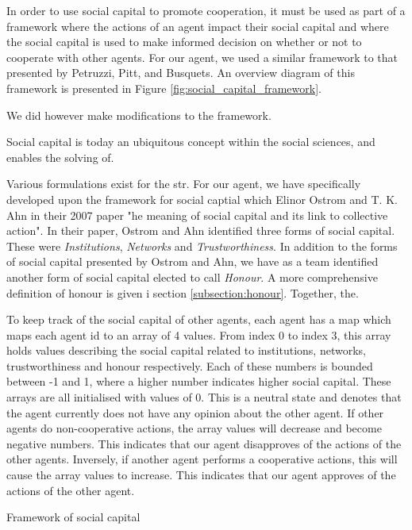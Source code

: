In order to use social capital to promote cooperation, it must be used as part of a framework where the actions of an agent impact their social capital and where the social capital is used to make informed decision on whether or not to cooperate with other agents. For our agent, we used a similar framework to that presented by Petruzzi, Pitt, and Busquets\cite{complexity_reduction}. An overview diagram of this framework is presented in Figure \ref{fig:social_capital_framework}.

We did however make modifications to the framework.


Social capital is today an ubiquitous concept within the social sciences, and enables the solving of. 

Various formulations exist for the str. For our agent, we have specifically developed upon the framework for social captial which Elinor Ostrom and T. K. Ahn in their 2007 paper "he meaning of social capital and its link to collective action". \cite{ostrom-ahn} In their paper, Ostrom and Ahn identified three forms of social capital. These were \emph{Institutions}, \emph{Networks} and \emph{Trustworthiness}. In addition to the forms of social capital presented by Ostrom and Ahn, we have as a team identified another form of social capital elected to call \emph{Honour}. A more comprehensive definition of honour is given i section \ref{subsection:honour}. Together, the. 

To keep track of the social capital of other agents, each agent has a map which maps each agent id to an array of 4 values. From index 0 to index 3, this array holds values describing the social capital related to institutions, networks, trustworthiness and honour respectively. Each of these numbers is bounded between -1 and 1, where a higher number indicates higher social capital. These arrays are all initialised with values of 0. This is a neutral state and denotes that the agent currently does not have any opinion about the other agent. If other agents do non-cooperative actions, the array values will decrease and become negative numbers. This indicates that our agent disapproves of the actions of the other agents. Inversely, if another agent performs a cooperative actions, this will cause the array values to increase. This indicates that our agent approves of the actions of the other agent.

Framework of social capital

